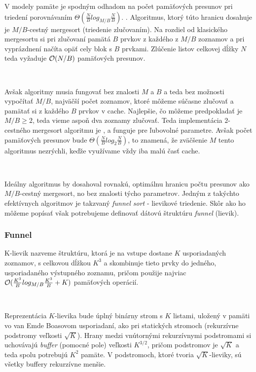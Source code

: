 V \aware modely pamäte je spodným odhadom na počet pamäťových presunov pri triedení porovnávaním $\Theta(\frac{N}{B}log_{M/B}\frac{N}{B})$. \citep{AggVitt88, Demaine02}. Algoritmus, ktorý túto hranicu dosahuje je $M/B$-cestný mergesort (triedenie zlučovaním). Na rozdiel od klasického mergesortu si pri zlučovaní pamätá $B$ prvkov z každého z $M/B$ zoznamov a pri vyprázdnení načíta opäť cely blok s $B$ prvkami. Zlúčenie listov celkovej dĺžky $N$ teda vyžaduje $\mathcal{O}(N/B)$ pamäťových presunov.

\

Avšak \obliv algoritmy musia fungovať bez znalosti $M$ a $B$ a teda bez možnosti vypočítať $M/B$, najväčší počet zoznamov, ktoré môžeme súčasne zlučovať a pamätať si z každého $B$ prvkov v cache. Najlepšie, čo môžeme predpokladať je $M/B \ge 2$, teda vieme aspoň dva zoznamy zlučovať. Teda implementácia $2$-cestného mergesort algoritmu je \obliv, a funguje pre ľubovolné parametre. Avšak počet pamäťových presunov bude $\Theta(\frac{N}{B}log_{2}\frac{N}{B})$, to znamená, že zväčšenie $M$ tento algoritmus nezrýchli, keďže využívame vždy iba malú časť cache. 

\

Ideálny \obliv algoritmus by dosahoval rovnakú, optimálnu hranicu počtu presunov ako $M/B$-cestný mergesort, no bez znalosti týcho parametrov. Jedným z takýchto efektívnych \obliv algoritmov je takzvaný {\em funnel sort} - lievikové triedenie. Skôr ako ho môžeme popísať však potrebujeme definovať dátovú štruktúru {\em funnel} (lievik).

\subsubsection{Funnel}

K-lievik nazveme štruktúru, ktorá je na vstupe dostane $K$ usporiadaných zoznamov, s celkovou dĺžkou $K^3$ a skombinuje tieto prvky do jedného, usporiadaného výstupného zoznamu, pričom použije najviac $\mathcal{O}(\frac{K^3}{B} log_{M/B} \frac{K^3}{B} + K)$ pamäťových operácií.

\

Reprezentácia $K$-lievika bude úplný binárny strom s $K$ listami, uložený v pamäti vo van Emde Boasovom usporiadaní, ako pri statických stromoch (rekurzívne podstromy veľkosti $\sqrt{K}$). Hrany medzi vnútornými rekurzívnymi podstromami si uchovávajú {\em buffer} (pomocné pole) veľkosti $K^{3/2}$, pričom podstromov je $\sqrt{K}$ a teda spolu potrebujú $K^2$ pamäte. V podstromoch, ktoré tvoria $\sqrt{K}$-lieviky, sú všetky buffery rekurzívne menšie.

